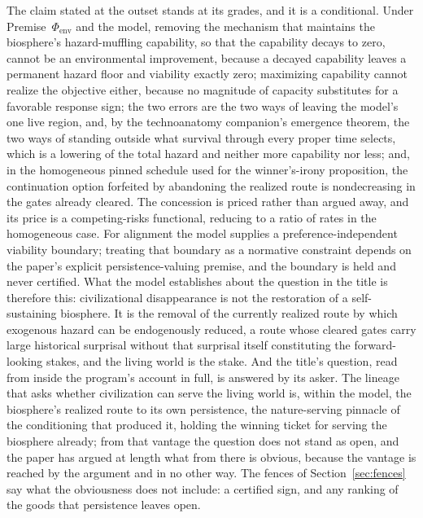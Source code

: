 The claim stated at the outset stands at its grades, and it is a
conditional. Under Premise~$\Phi_{\mathrm{env}}$ and the model, removing
the mechanism that maintains the biosphere's hazard-muffling capability,
so that the capability decays to zero, cannot be an environmental
improvement, because a decayed capability leaves a permanent hazard
floor and viability exactly zero; maximizing capability cannot
realize the objective either, because no magnitude of capacity
substitutes for a favorable response sign; the two errors are the two
ways of leaving the model's one live region, and, by the technoanatomy
companion's emergence theorem, the two ways of standing outside what
survival through every proper time selects, which is a lowering of the
total hazard and neither more capability nor less; and, in the homogeneous
pinned schedule used for the winner's-irony proposition, the
continuation option forfeited by abandoning the realized route is
nondecreasing in the gates already cleared. The concession is priced rather
than argued away, and its price is a competing-risks functional,
reducing to a ratio of rates in the homogeneous case. For alignment the
model supplies a preference-independent viability boundary; treating
that boundary as a normative constraint depends on the paper's explicit
persistence-valuing premise, and the boundary is held and never
certified. What the model
establishes about the question in the title is therefore this:
civilizational disappearance is not the restoration of a
self-sustaining biosphere. It is the removal of the currently realized
route by which exogenous hazard can be endogenously reduced, a route
whose cleared gates carry large historical surprisal without that
surprisal itself constituting the forward-looking stakes, and the living
world is the stake. And the title's question, read from inside the
program's account in full, is answered by its asker. The lineage that asks
whether civilization can serve the living world is, within the model, the
biosphere's realized route to its own persistence, the nature-serving
pinnacle of the conditioning that produced it, holding the winning ticket
for serving the biosphere already; from that vantage the question does not
stand as open, and the paper has argued at length what from there is
obvious, because the vantage is reached by the argument and in no other
way. The fences of Section~\ref{sec:fences} say what the obviousness does
not include: a certified sign, and any ranking of the goods that
persistence leaves open.

\printbibliography
